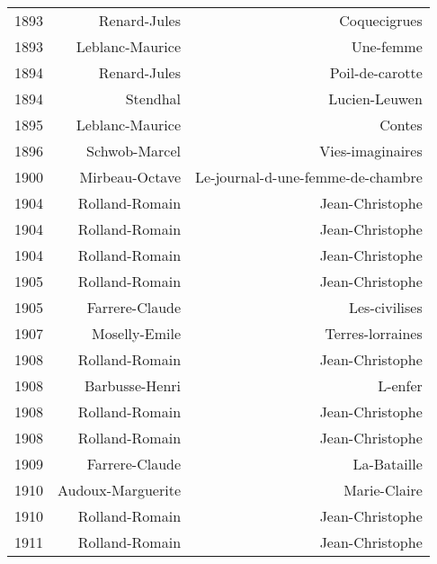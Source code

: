 \begin{xltabular}{\textwidth}{lrr}
1893 &                         Renard-Jules &                          Coquecigrues \\
1893 &                      Leblanc-Maurice &                             Une-femme \\
1894 &                         Renard-Jules &                       Poil-de-carotte \\
1894 &                             Stendhal &                         Lucien-Leuwen \\
1895 &                      Leblanc-Maurice &                                Contes \\
1896 &                        Schwob-Marcel &                      Vies-imaginaires \\
1900 &                       Mirbeau-Octave &     Le-journal-d-une-femme-de-chambre \\
1904 &                       Rolland-Romain &                       Jean-Christophe \\
1904 &                       Rolland-Romain &                       Jean-Christophe \\
1904 &                       Rolland-Romain &                       Jean-Christophe \\
1905 &                       Rolland-Romain &                       Jean-Christophe \\
1905 &                       Farrere-Claude &                         Les-civilises \\
1907 &                        Moselly-Emile &                      Terres-lorraines \\
1908 &                       Rolland-Romain &                       Jean-Christophe \\
1908 &                       Barbusse-Henri &                               L-enfer \\
1908 &                       Rolland-Romain &                       Jean-Christophe \\
1908 &                       Rolland-Romain &                       Jean-Christophe \\
1909 &                       Farrere-Claude &                           La-Bataille \\
1910 &                    Audoux-Marguerite &                          Marie-Claire \\
1910 &                       Rolland-Romain &                       Jean-Christophe \\
1911 &                       Rolland-Romain &                       Jean-Christophe \\

\end{xltabular}
